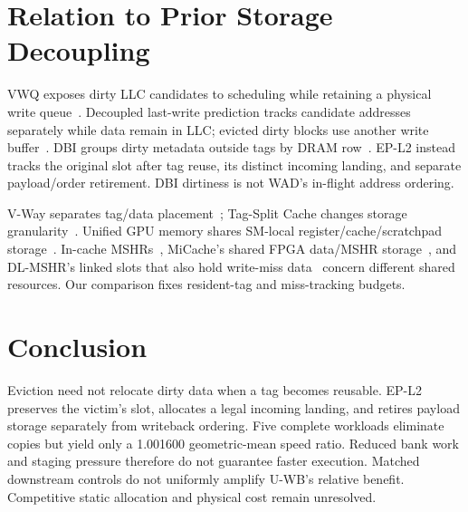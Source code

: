 \documentclass[conference,letterpaper]{IEEEtran}
\begin{document}
\section{Relation to Prior Storage Decoupling}
VWQ exposes dirty LLC candidates to scheduling while retaining a physical write queue~\cite{vwq}. Decoupled last-write prediction tracks candidate addresses separately while data remain in LLC; evicted dirty blocks use another write buffer~\cite{lastwrite}. DBI groups dirty metadata outside tags by DRAM row~\cite{dbi}. EP-L2 instead tracks the original slot after tag reuse, its distinct incoming landing, and separate payload/order retirement. DBI dirtiness is not WAD's in-flight address ordering.

V-Way separates tag/data placement~\cite{vway}; Tag-Split Cache changes storage granularity~\cite{tsc}. Unified GPU memory shares SM-local register/cache/scratchpad storage~\cite{unified}. In-cache MSHRs~\cite{farkas}, MiCache's shared FPGA data/MSHR storage~\cite{micache}, and DL-MSHR's linked slots that also hold write-miss data~\cite{dlmshr} concern different shared resources. Our comparison fixes resident-tag and miss-tracking budgets.

\section{Conclusion}
Eviction need not relocate dirty data when a tag becomes reusable. EP-L2 preserves the victim's slot, allocates a legal incoming landing, and retires payload storage separately from writeback ordering. Five complete workloads eliminate copies but yield only a 1.001600 geometric-mean speed ratio. Reduced bank work and staging pressure therefore do not guarantee faster execution. Matched downstream controls do not uniformly amplify U-WB's relative benefit. Competitive static allocation and physical cost remain unresolved.

\clearpage


\end{document}
